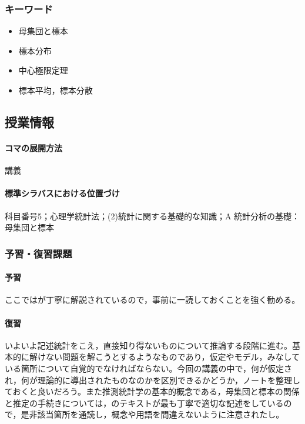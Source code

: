 \subsubsection{キーワード}
\begin{itemize}
	\item 母集団と標本
	\item 標本分布
	\item 中心極限定理
	\item 標本平均，標本分散
\end{itemize}
\subsection{授業情報}
\paragraph{コマの展開方法}
講義
\paragraph{標準シラバスにおける位置づけ}
科目番号5；心理学統計法；(2)統計に関する基礎的な知識；A 統計分析の基礎：母集団と標本
\subsubsection{予習・復習課題}
\paragraph{予習}
ここでは\citet{Yamada2004}が丁寧に解説されているので，事前に一読しておくことを強く勧める。
\paragraph{復習}
いよいよ記述統計をこえ，直接知り得ないものについて推論する段階に進む。基本的に解けない問題を解こうとするようなものであり，仮定やモデル，みなしている箇所について自覚的でなければならない。今回の講義の中で，何が仮定され，何が理論的に導出されたものなのかを区別できるかどうか，ノートを整理しておくと良いだろう。また推測統計学の基本的概念である，母集団と標本の関係と推定の手続きについては，\citet{Yamada2004}のテキストが最も丁寧で適切な記述をしているので，是非該当箇所を通読し，概念や用語を間違えないように注意されたし。
